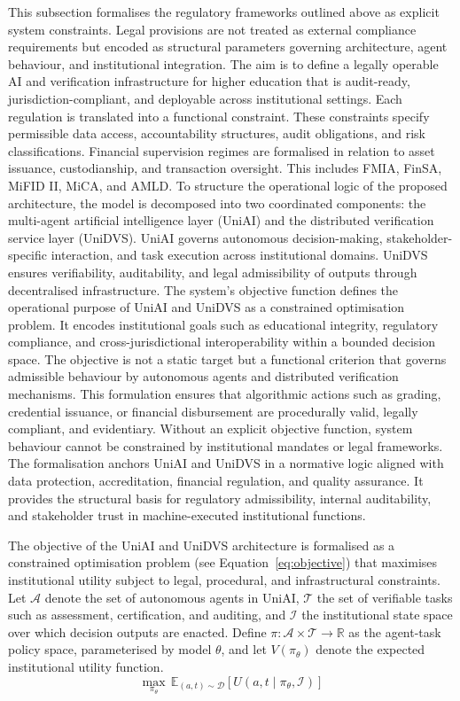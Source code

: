 \documentclass[oneside,10pt]{swissi}
\begin{document}
This subsection formalises the regulatory frameworks outlined above as explicit system constraints. Legal provisions are not treated as external compliance requirements but encoded as structural parameters governing architecture, agent behaviour, and institutional integration. The aim is to define a legally operable AI and verification infrastructure for higher education that is audit-ready, jurisdiction-compliant, and deployable across institutional settings. Each regulation is translated into a functional constraint. These constraints specify permissible data access, accountability structures, audit obligations, and risk classifications. Financial supervision regimes are formalised in relation to asset issuance, custodianship, and transaction oversight. This includes FMIA, FinSA, MiFID II, MiCA, and AMLD. To structure the operational logic of the proposed architecture, the model is decomposed into two coordinated components: the multi-agent artificial intelligence layer (UniAI) and the distributed verification service layer (UniDVS). UniAI governs autonomous decision-making, stakeholder-specific interaction, and task execution across institutional domains. UniDVS ensures verifiability, auditability, and legal admissibility of outputs through decentralised infrastructure.  The system's objective function defines the operational purpose of UniAI and UniDVS as a constrained optimisation problem. It encodes institutional goals such as educational integrity, regulatory compliance, and cross-jurisdictional interoperability within a bounded decision space. The objective is not a static target but a functional criterion that governs admissible behaviour by autonomous agents and distributed verification mechanisms. This formulation ensures that algorithmic actions such as grading, credential issuance, or financial disbursement are procedurally valid, legally compliant, and evidentiary. Without an explicit objective function, system behaviour cannot be constrained by institutional mandates or legal frameworks. The formalisation anchors UniAI and UniDVS in a normative logic aligned with data protection, accreditation, financial regulation, and quality assurance. It provides the structural basis for regulatory admissibility, internal auditability, and stakeholder trust in machine-executed institutional functions.

The objective of the UniAI and UniDVS architecture is formalised as a constrained optimisation problem (see Equation~\ref{eq:objective}) that maximises institutional utility subject to legal, procedural, and infrastructural constraints. Let $\mathcal{A}$ denote the set of autonomous agents in UniAI, $\mathcal{T}$ the set of verifiable tasks such as assessment, certification, and auditing, and $\mathcal{I}$ the institutional state space over which decision outputs are enacted. Define $\pi: \mathcal{A} \times \mathcal{T} \rightarrow \mathbb{R}$ as the agent-task policy space, parameterised by model $\theta$, and let $V(\pi_\theta)$ denote the expected institutional utility function.
\begin{equation}
\label{eq:objective}
\max_{\pi_\theta} \, \mathbb{E}_{(a,t) \sim \mathcal{D}} \left[ U(a, t \mid \pi_\theta, \mathcal{I}) \right]
\end{equation}
\end{document}
